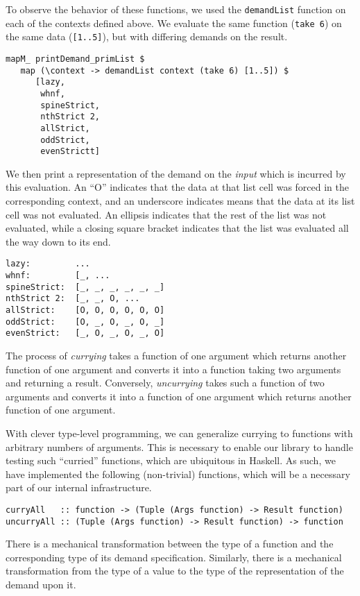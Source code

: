 \documentclass{article}
\begin{document}
To observe the behavior of these functions, we used the \verb|demandList|
function on each of the contexts defined above. We evaluate the same function
(\verb|take 6|) on the same data (\verb|[1..5]|), but with differing demands on
the result.

\begin{verbatim}
mapM_ printDemand_primList $
   map (\context -> demandList context (take 6) [1..5]) $
      [lazy,
       whnf,
       spineStrict,
       nthStrict 2,
       allStrict,
       oddStrict,
       evenStrictt]
\end{verbatim}

We then print a representation of the demand on the \emph{input} which is
incurred by this evaluation. An ``O'' indicates that the data at that list cell
was forced in the corresponding context, and an underscore indicates means that
the data at its list cell was not evaluated. An ellipsis indicates that the rest
of the list was not evaluated, while a closing square bracket indicates that the
list was evaluated all the way down to its end.

\begin{verbatim}
lazy:         ...
whnf:         [_, ...
spineStrict:  [_, _, _, _, _, _]
nthStrict 2:  [_, _, O, ...
allStrict:    [O, O, O, O, O, O]
oddStrict:    [O, _, O, _, O, _]
evenStrict:   [_, O, _, O, _, O]
\end{verbatim}

The process of \emph{currying} takes a function of one argument which returns
another function of one argument and converts it into a function taking two
arguments and returning a result. Conversely, \emph{uncurrying} takes such a
function of two arguments and converts it into a function of one argument which
returns another function of one argument.

With clever type-level programming, we can generalize currying to functions with
arbitrary numbers of arguments. This is necessary to enable our library to
handle testing such ``curried'' functions, which are ubiquitous in Haskell. As
such, we have implemented the following (non-trivial) functions, which will be a
necessary part of our internal infrastructure.

\begin{verbatim}
curryAll   :: function -> (Tuple (Args function) -> Result function)
uncurryAll :: (Tuple (Args function) -> Result function) -> function
\end{verbatim}

There is a mechanical transformation between the type of a function and the
corresponding type of its demand specification. Similarly, there is a mechanical
transformation from the type of a value to the type of the representation of the
demand upon it.
\end{document}
